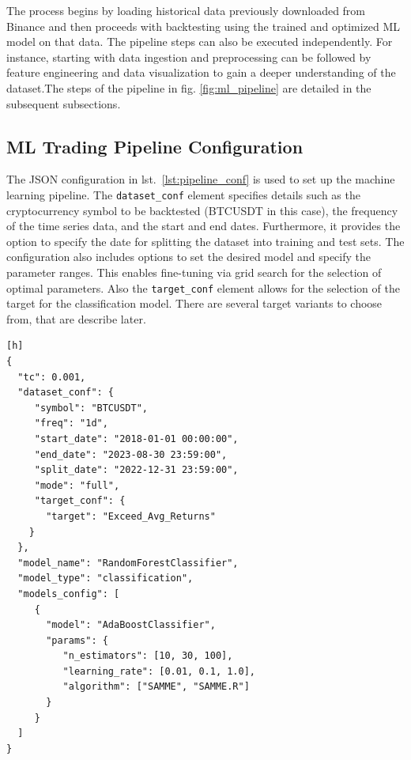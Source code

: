 The process begins by loading historical data previously downloaded from Binance and then proceeds with backtesting using the trained and optimized ML model on that data.
The pipeline steps can also be executed independently.
For instance, starting with data ingestion and preprocessing can be followed by feature engineering and data visualization to gain a deeper understanding of the dataset.The steps of the pipeline in fig. \ref{fig:ml_pipeline} are detailed in the subsequent subsections.

\subsection{ML Trading Pipeline Configuration}
The JSON configuration in lst.~\ref{lst:pipeline_conf} is used to set up the machine learning pipeline.
The \texttt{dataset\_conf} element specifies details such as the cryptocurrency symbol to be backtested (BTCUSDT in this case), the frequency of the time series data, and the start and end dates.
Furthermore, it provides the option to specify the date for splitting the dataset into training and test sets.
The configuration also includes options to set the desired model and specify the parameter ranges.
This enables fine-tuning via grid search for the selection of optimal parameters.
Also the \texttt{target\_conf} element allows for the selection of the target for the classification model. There are several target variants to choose from, that are describe later.



\noindent\begin{minipage}{\linewidth}
\begin{lstlisting}[style=jsonstyle, caption={Machine Learning Pipeline Configuration},  captionpos=b, label=lst:pipeline_conf][h]
{
  "tc": 0.001,
  "dataset_conf": {
     "symbol": "BTCUSDT",
     "freq": "1d",
     "start_date": "2018-01-01 00:00:00",
     "end_date": "2023-08-30 23:59:00",
     "split_date": "2022-12-31 23:59:00",
     "mode": "full",
     "target_conf": {
       "target": "Exceed_Avg_Returns"
    }
  },
  "model_name": "RandomForestClassifier",
  "model_type": "classification",
  "models_config": [
     {
       "model": "AdaBoostClassifier",
       "params": {
          "n_estimators": [10, 30, 100],
          "learning_rate": [0.01, 0.1, 1.0],
          "algorithm": ["SAMME", "SAMME.R"]
       }
     }
  ]
}
\end{lstlisting}
\end{minipage}



